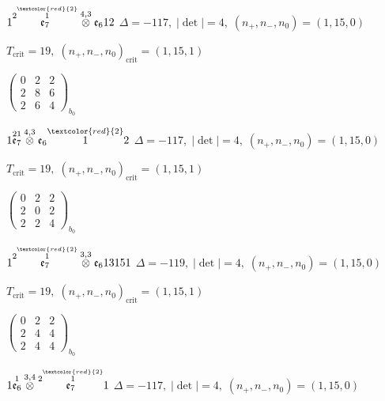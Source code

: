 \documentclass[10pt]{article}
\begin{document}
$1\overset{2\overset{\textcolor{red}{2}}{1}}{\mathfrak{e}_7}\overset{4,3}{\otimes}\mathfrak{e}_612$ \quad $\Delta=-117,\; |\det|=4,\; (n_+,n_-,n_0)=(1,15,0)$

\hspace{1em}$T_{\text{crit}}=19,\; (n_+,n_-,n_0)_{\text{crit}}=(1,15,1)$

\hspace{2em}$\left(\begin{smallmatrix}0 & 2 & 2 \\ 2 & 8 & 6 \\ 2 & 6 & 4\end{smallmatrix}\right)_{\!b_0}$

$1\overset{21}{\mathfrak{e}_7}\overset{4,3}{\otimes}\mathfrak{e}_6\overset{\textcolor{red}{2}}{1}2$ \quad $\Delta=-117,\; |\det|=4,\; (n_+,n_-,n_0)=(1,15,0)$

\hspace{1em}$T_{\text{crit}}=19,\; (n_+,n_-,n_0)_{\text{crit}}=(1,15,1)$

\hspace{2em}$\left(\begin{smallmatrix}0 & 2 & 2 \\ 2 & 0 & 2 \\ 2 & 2 & 4\end{smallmatrix}\right)_{\!b_0}$

\smallskip

$1\overset{2\overset{\textcolor{red}{2}}{1}}{\mathfrak{e}_7}\overset{3,3}{\otimes}\mathfrak{e}_613151$ \quad $\Delta=-119,\; |\det|=4,\; (n_+,n_-,n_0)=(1,15,0)$

\hspace{1em}$T_{\text{crit}}=19,\; (n_+,n_-,n_0)_{\text{crit}}=(1,15,1)$

\hspace{2em}$\left(\begin{smallmatrix}0 & 2 & 2 \\ 2 & 4 & 4 \\ 2 & 4 & 4\end{smallmatrix}\right)_{\!b_0}$

\smallskip

$1\overset{1}{\mathfrak{e}_6}\overset{3,4}{\otimes}\overset{2\overset{\textcolor{red}{2}}{1}}{\mathfrak{e}_7}1$ \quad $\Delta=-117,\; |\det|=4,\; (n_+,n_-,n_0)=(1,15,0)$
\end{document}
